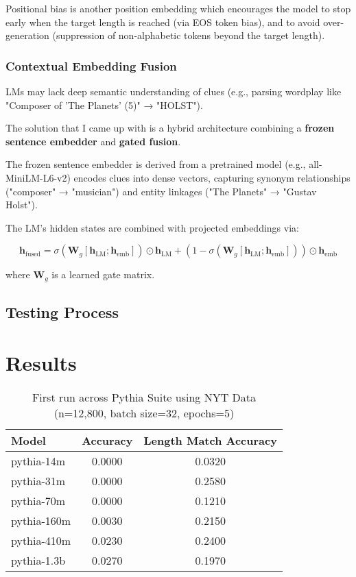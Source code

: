 \documentclass[
	a4paper, %
	10pt, %
	unnumberedsections, %
	twoside, %
]{LTJournalArticle}
\begin{document}
Positional bias is another position embedding which encourages the model to stop early when the target length is reached (via EOS token bias), and to avoid over-generation (suppression of non-alphabetic tokens beyond the target length).

\subsubsection{Contextual Embedding Fusion}
LMs may lack deep semantic understanding of clues (e.g., parsing wordplay like "Composer of 'The Planets' (5)" → "HOLST").

The solution that I came up with is a hybrid architecture combining a \textbf{frozen sentence embedder} and \textbf{gated fusion}.

The frozen sentence embedder is derived from a pretrained model (e.g., all-MiniLM-L6-v2) encodes clues into dense vectors, capturing synonym relationships ("composer" → "musician") and entity linkages ("The Planets" → "Gustav Holst").

The LM’s hidden states are combined with projected embeddings via:

\[\mathbf{h}_{\text{fused}} = \sigma\left(\mathbf{W}_g \left[\mathbf{h}_{\text{LM}}; \mathbf{h}_{\text{emb}}\right]\right) \odot \mathbf{h}_{\text{LM}} + \left(1 - \sigma\left(\mathbf{W}_g \left[\mathbf{h}_{\text{LM}}; \mathbf{h}_{\text{emb}}\right]\right)\right) \odot \mathbf{h}_{\text{emb}}\]

where $\mathbf{W}_g$ is a learned gate matrix.
\subsection{Testing Process}


\section{Results}

\begin{table}[h] %
	\centering
	\begin{tabular}{l c c}
		\toprule
		Model & Accuracy & Length Match Accuracy \\
		\midrule
		pythia-14m & 0.0000 & 0.0320 \\
		pythia-31m & 0.0000 & 0.2580 \\
		pythia-70m & 0.0000 & 0.1210 \\
		pythia-160m & 0.0030 & 0.2150 \\
		pythia-410m & 0.0230 & 0.2400 \\
		pythia-1.3b & 0.0270 & 0.1970 \\
		\bottomrule
	\end{tabular}
	\label{tab:pythiarun1}
	\caption{First run across Pythia Suite using NYT Data (n=12,800, batch size=32, epochs=5)}
\end{table}
\end{document}
